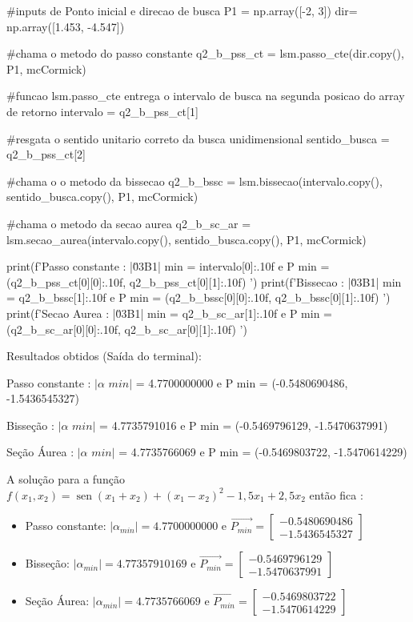 \documentclass[10pt, a4paper]{article}
\DeclareMathOperator{\sen}{sen}
\begin{document}
\begin{python}

  #inputs de Ponto inicial e direcao de busca
  P1 = np.array([-2, 3])
  dir= np.array([1.453, -4.547])

  #chama o metodo do passo constante
  q2_b_pss_ct = lsm.passo_cte(dir.copy(), P1, mcCormick)

  #funcao lsm.passo_cte entrega o intervalo de busca na segunda posicao do array de retorno
  intervalo = q2_b_pss_ct[1]

  #resgata o sentido unitario correto da busca unidimensional
  sentido_busca = q2_b_pss_ct[2]

  #chama o o metodo da bissecao
  q2_b_bssc = lsm.bissecao(intervalo.copy(), sentido_busca.copy(), P1, mcCormick)

  #chama o metodo da secao aurea
  q2_b_sc_ar = lsm.secao_aurea(intervalo.copy(), sentido_busca.copy(), P1, mcCormick)

  print(f'Passo constante : |\u03B1| min = {intervalo[0]:.10f} e P min = ({q2_b_pss_ct[0][0]:.10f}, {q2_b_pss_ct[0][1]:.10f}) ')
  print(f'Bissecao        : |\u03B1| min = {q2_b_bssc[1]:.10f} e P min = ({q2_b_bssc[0][0]:.10f}, {q2_b_bssc[0][1]:.10f}) ')
  print(f'Secao Aurea     : |\u03B1| min = {q2_b_sc_ar[1]:.10f} e P min = ({q2_b_sc_ar[0][0]:.10f}, {q2_b_sc_ar[0][1]:.10f}) ')

\end{python}

Resultados obtidos (Saída do terminal):
\newline


Passo constante : $|\alpha \,\, min|$ = 4.7700000000 e P min = (-0.5480690486, -1.5436545327)

Bisseção        : $|\alpha \,\, min|$ = 4.7735791016 e P min = (-0.5469796129, -1.5470637991)

Seção Áurea     : $|\alpha \,\,  min|$ = 4.7735766069 e P min = (-0.5469803722, -1.5470614229)\newline

A solução para a função $f(x_1, x_2) = \sen{(x_1 + x_2)} + (x_1 - x_2)^2 - 1,5x_1 + 2,5x_2$ então fica :
\newline

\begin{itemize}
  \item Passo constante: $|\alpha_{min}| = 4.7700000000$ e $\overrightarrow{P_{min}} =  
  \begin{bmatrix}
    -0.5480690486 \\ -1.5436545327
  \end{bmatrix}$
  \item Bisseção: $|\alpha_{min}| = 4.77357910169$ e $\overrightarrow{P_{min}} =  
  \begin{bmatrix}
    -0.5469796129 \\ -1.5470637991
  \end{bmatrix}$
  \item Seção Áurea: $|\alpha_{min}| = 4.7735766069$ e $\overrightarrow{P_{min}} =  
  \begin{bmatrix}
    -0.5469803722 \\ -1.5470614229
  \end{bmatrix}$
\end{itemize}
\end{document}
